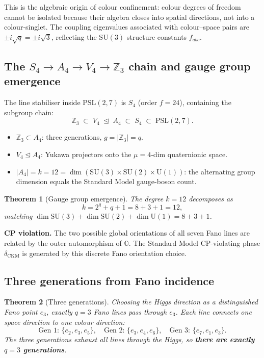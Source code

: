 \documentclass[12pt,a4paper]{article}
\newtheorem{theorem}{Theorem}[section]
\theoremstyle{definition}
\newcommand{\SU}{\mathrm{SU}}
\newcommand{\OO}{\mathbb{O}}
\newcommand{\ZZ}{\mathbb{Z}}
\newcommand{\PSL}{\mathrm{PSL}}
\begin{document}
This is the algebraic origin of colour confinement: colour degrees of
freedom cannot be isolated because their algebra closes into spatial
directions, not into a colour-singlet.  The coupling eigenvalues
associated with colour--space pairs are $\pm i\sqrt{q}=\pm i\sqrt{3}$,
reflecting the $\SU(3)$ structure constants $f_{abc}$.

\subsection{The \texorpdfstring{$S_4\to A_4\to V_4\to\ZZ_3$}{S4->A4->V4->Z3} chain and gauge group emergence}

The line stabiliser inside $\PSL(2,7)$ is $S_4$ (order $f=24$), containing
the subgroup chain:
\begin{equation}
  \label{eq:chain_sub}
  \ZZ_3 \;\subset\; V_4 \;\trianglelefteq\; A_4 \;\subset\; S_4
  \;\subset\; \PSL(2,7).
\end{equation}
\begin{itemize}[nosep]
\item $\ZZ_3\subset A_4$: three generations, $g=|\ZZ_3|=q$.
\item $V_4\trianglelefteq A_4$: Yukawa projectors onto the $\mu=4$-dim
  quaternionic space.
\item $|A_4|=k=12=\dim(\SU(3)\times\SU(2)\times\mathrm{U}(1))$: the
  alternating group dimension equals the Standard Model gauge-boson count.
\end{itemize}

\begin{theorem}[Gauge group emergence]
The degree $k=12$ decomposes as
\begin{equation}
  k = 2^q + q + 1 = 8 + 3 + 1 = 12,
\end{equation}
matching $\dim\SU(3)+\dim\SU(2)+\dim\mathrm{U}(1)=8+3+1$.
\end{theorem}

\noindent\textbf{CP violation.}
The two possible global orientations of all seven Fano lines are related
by the outer automorphism of $\OO$.  The Standard Model CP-violating
phase $\delta_{\mathrm{CKM}}$ is generated by this discrete Fano orientation choice.

\subsection{Three generations from Fano incidence}

\begin{theorem}[Three generations]
Choosing the Higgs direction as a distinguished Fano point $e_3$,
exactly $q=3$ Fano lines pass through $e_3$.  Each line connects one
space direction to one colour direction:
\begin{equation}
  \text{Gen 1: } \{e_2,e_3,e_5\},\quad
  \text{Gen 2: } \{e_3,e_4,e_6\},\quad
  \text{Gen 3: } \{e_7,e_1,e_3\}.
\end{equation}
The three generations exhaust all lines through the Higgs, so
\textbf{there are exactly $q=3$ generations}.
\end{theorem}
\end{document}
